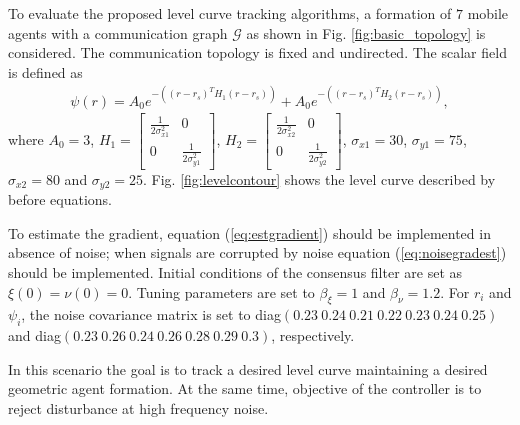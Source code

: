 To evaluate the proposed level curve tracking algorithms, a formation of $7$ mobile agents with a communication graph $\mathcal{G}$ as shown in Fig. \ref{fig:basic_topology} is considered. The communication topology is fixed and undirected.
The scalar field is defined as
\begin{align*}
\psi(r)=A_0e^{-\left((r-r_s)^TH_1(r-r_s)\right)}+A_0e^{-\left((r-r_s)^TH_2(r-r_s)\right)},
\end{align*}
where $A_0=3$,
$H_1=
\begin{bmatrix}
\frac{1}{2\sigma_{x1}^2} & 0\\
0 & \frac{1}{2\sigma_{y1}^2}
\end{bmatrix}
$,  
$H_2=
\begin{bmatrix}
\frac{1}{2\sigma_{x2}^2} & 0\\
0 & \frac{1}{2\sigma_{y2}^2}
\end{bmatrix}
$, 
$\sigma_{x1}=30$, $\sigma_{y1}=75$, $\sigma_{x2}=80$ and $\sigma_{y2}=25$. %
Fig. \ref{fig:levelcontour} shows the level curve described by before equations.

To estimate the gradient, equation (\ref{eq:estgradient}) should be implemented in absence of noise; when signals are corrupted by noise  equation (\ref{eq:noisegradest}) should be implemented. Initial conditions of the consensus filter are set as $\xi(0)=\nu(0)=0$. Tuning parameters are set to $\beta_{\xi}=1$ and $\beta_{\nu}=1.2$.  For $r_i$ and $\psi_i$, the noise covariance matrix is set to diag$(0.23\ 0.24\ 0.21\ 0.22 \ 0.23\ 0.24 \ 0.25)$ and diag$(0.23\ 0.26\ 0.24\ 0.26 \ 0.28\ 0.29\ 0.3)$, respectively. 


In this scenario the goal is to track a desired level curve maintaining a desired geometric agent formation. At the same time, objective of the controller is to reject disturbance at high frequency noise.


